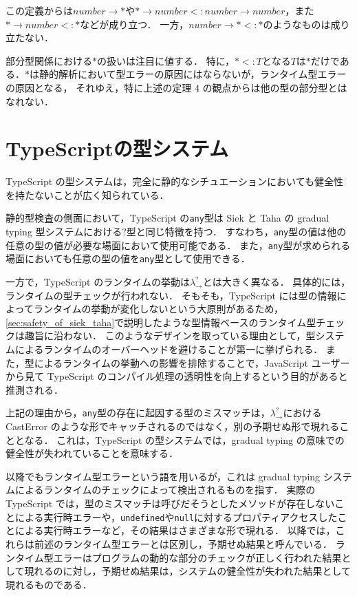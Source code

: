 この定義からは$number \to *$や$* \to number <: number \to number$，また$* \to number <: *$などが成り立つ．
一方，$number \to * <: *$のようなものは成り立たない．

部分型関係における$*$の扱いは注目に値する．
特に，$* <: T$となる$T$は$*$だけである．$*$は静的解析において型エラーの原因にはならないが，ランタイム型エラーの原因となる，
それゆえ，特に上述の定理 4 の観点からは他の型の部分型とはなれない．

\section{TypeScriptの型システム}

TypeScript の型システムは，完全に静的なシチュエーションにおいても健全性を持たないことが広く知られている．

静的型検査の側面において，TypeScript の\texttt{any}型は Siek と Taha の gradual typing 型システムにおける$?$型と同じ特徴を持つ．
すなわち，\texttt{any}型の値は他の任意の型の値が必要な場面において使用可能である．
また，\texttt{any}型が求められる場面においても任意の型の値を\texttt{any}型として使用できる．

一方で，TypeScript のランタイムの挙動は$\lambda^?_\to$とは大きく異なる．
具体的には，ランタイムの型チェックが行われない．
そもそも，TypeScript には型の情報によってランタイムの挙動が変化しないという大原則があるため，\ref{sec:safety_of_siek_taha}で説明したような型情報ベースのランタイム型チェックは趣旨に沿わない．
このようなデザインを取っている理由として，型システムによるランタイムのオーバーヘッドを避けることが第一に挙げられる．
また，型によるランタイムの挙動への影響を排除することで，JavaScript ユーザーから見て TypeScript のコンパイル処理の透明性を向上するという目的があると推測される．

上記の理由から，\texttt{any}型の存在に起因する型のミスマッチは，$\lambda^?_\to$における CastError のような形でキャッチされるのではなく，別の予期せぬ形で現れることとなる．
これは，TypeScript の型システムでは，gradual typing の意味での健全性が失われていることを意味する．

以降でもランタイム型エラーという語を用いるが，これは gradual typing システムによるランタイムのチェックによって検出されるものを指す．
実際の TypeScript では，型のミスマッチは呼びだそうとしたメソッドが存在しないことによる実行時エラーや，\texttt{undefined}や\texttt{null}に対するプロパティアクセスしたことによる実行時エラーなど，その結果はさまざまな形で現れる．
以降では，これらは前述のランタイム型エラーとは区別し，予期せぬ結果と呼んでいる．
ランタイム型エラーはプログラムの動的な部分のチェックが正しく行われた結果として現れるのに対し，予期せぬ結果は，システムの健全性が失われた結果として現れるものである．


